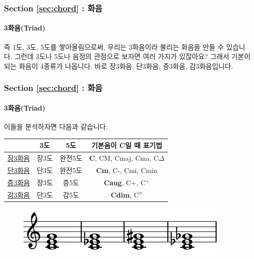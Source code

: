 \documentclass{beamer}
\begin{document}
	\begin{frame}
		\frametitle{Section \ref{sec:chord} : 화음}
		\framesubtitle{3화음(Triad)}
		즉 1도, 3도, 5도를 쌓아올림으로써, 우리는 3화음이라 불리는 화음을 만들 수  있습니다. 그런데 3도나 5도나 음정의 관점으로 보자면 여러 가지가 있잖아요? 그래서 기본이 되는 화음이 4종류가 나옵니다. 바로 장3화음, 단3화음, 증3화음, 감3화음입니다.
	\end{frame}
	
	\begin{frame}
		\frametitle{Section \ref{sec:chord} : 화음}
		\framesubtitle{3화음(Triad)}
		이들을 분석하자면 다음과 같습니다.
		\begin{table}
			\begin{tabular}{|c|c|c|c|}
				\hline
				& 3도 & 5도 & 기본음이 C일 때 표기법 \\ \hline
				\color{cyan}\href{run:res/mp3/9/chord/triad/C_major.mp3}{장3화음} & 장3도 & 완전5도 & {\bf C}, CM, Cmaj, Cma, C$\Delta$\\ \hline
				\color{cyan}\href{run:res/mp3/9/chord/triad/C_minor.mp3}{단3화음} & 단3도 & 완전5도 & {\bf Cm}, C-, Cmi, Cmin\\ \hline
				\color{cyan}\href{run:res/mp3/9/chord/triad/C_aug.mp3}{증3화음} & 장3도 & 증5도 & {\bf Caug}, C+, C$^+$\\ \hline
				\color{cyan}\href{run:res/mp3/9/chord/triad/C_dim.mp3}{감3화음} & 단3도 & 감5도 & {\bf Cdim}, C$\degree$\\ \hline
			\end{tabular}
		\end{table}
		\vskip -1.5pc
		\begin{figure}
			\centering
			\includegraphics[width=\textwidth]{res/pdf/9/chord/triad.pdf}
		\end{figure}
	\end{frame}
	
\end{document}
